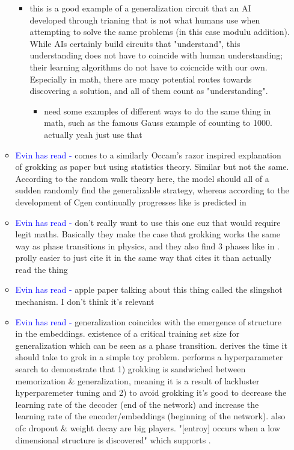 \documentclass{article}
\begin{document}
\begin{itemize}
\begin{itemize}
\begin{itemize}
            \item this is a good example of a generalization circuit that an AI developed through trianing that is not what humans use when attempting to solve the same problems (in this case modulu addition). While AIs certainly build circuits that "understand", this understanding does not have to coincide with human understanding; their learning algorithms do not have to coicncide with our own. Especially in math, there are many potential routes towards discovering a solution, and all of them count as "understanding". 
            \begin{itemize}
                \item need some examples of different ways to do the same thing in math, such as the famous Gauss example of counting to 1000. actually yeah just use that
            \end{itemize}
        \end{itemize}
        \item \textcolor{blue}{Evin has read -} \cite{millidge2022gg} comes to a similarly Occam’s razor inspired explanation of grokking as \cite{varma2023explaining} paper but using statistics theory. Similar but not the same. According to the random walk theory here, the model should all of a sudden randomly find the generalizable strategy, whereas according to \cite{nanda2023progress} the development of Cgen continually progresses like is predicted in \cite{varma2023explaining}
        \item \textcolor{blue}{Evin has read -} \cite{rubin2023droplets} don’t really want to use this one cuz that would require legit maths. Basically they make the case that grokking works the same way as phase transitions in physics, and they also find 3 phases like in \cite{nanda2023progress}. prolly easier to just cite it in the same way that \cite{nanda2023progress} cites it than actually read the thing
        \item \textcolor{blue}{Evin has read -} \cite{thilak2022slingshot} apple paper talking about this thing called the slingshot mechanism. I don't think it's relevant
        \item \textcolor{blue}{Evin has read -} \cite{liu2022towards} generalization coincides with the emergence of structure in the embeddings. existence of a critical training set size for generalization which can be seen as a phase transition. derives the time it should take to grok in a simple toy problem. performs a hyperparameter search to demonstrate that 1) grokking is sandwiched between memorization \& generalization, meaning it is a result of lackluster hyperparemeter tuning and 2) to avoid grokking it's good to decrease the learning rate of the decoder (end of the network) and increase the learning rate of the encoder/embeddings (beginning of the network). also ofc dropout \& weight decay are big players. "[entroy] occurs when a low dimensional structure is discovered" which supports \cite{varma2023explaining}.

\end{itemize}
\end{itemize}
\end{document}
